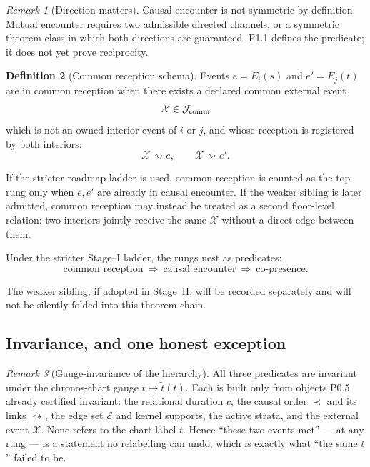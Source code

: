 \documentclass[11pt,a4paper]{article}
\def\mathfrak#1{#1}%
\def\emph#1{#1}%
\theoremstyle{definition}
\newtheorem{definition}{Definition}[section]
\theoremstyle{plain}
\theoremstyle{remark}
\newtheorem{remark}[definition]{Remark}
\begin{document}
\begin{remark}[Direction matters]
Causal encounter is not symmetric by definition. Mutual encounter requires two
admissible directed channels, or a symmetric theorem class in which both
directions are guaranteed. P1.1 defines the predicate; it does not yet prove
reciprocity.
\end{remark}

\begin{definition}[Common reception schema]\label{def:comrec}
Events \(e=E_i(s)\) and \(e'=E_j(t)\) are in \emph{common reception} when there
exists a declared common external event
\[
\mathcal X\in\mathcal J_{\rm comm}
\]
which is not an owned interior event of \(i\) or \(j\), and whose reception is
registered by both interiors:
\[
\mathcal X\rightsquigarrow e,
\qquad
\mathcal X\rightsquigarrow e'.
\]

If the stricter roadmap ladder is used, common reception is counted as the top
rung only when \(e,e'\) are already in causal encounter. If the weaker sibling is
later admitted, common reception may instead be treated as a second floor-level
relation: two interiors jointly receive the same \(\mathcal X\) without a direct
edge between them.
\end{definition}

Under the stricter Stage--I ladder, the rungs nest as predicates:
\[
\boxed{\;
\text{common reception}\ \Longrightarrow\ \text{causal encounter}\ \Longrightarrow\ \text{co-presence}.
\;}
\]

The weaker sibling, if adopted in Stage~II, will be recorded separately and will not
be silently folded into this theorem chain.

\subsection{Invariance, and one honest exception}

\begin{remark}[Gauge-invariance of the hierarchy]
All three predicates are invariant under the chronos-chart gauge \(t\mapsto\widetilde t(t)\).
Each is built only from objects P0.5 already certified invariant: the relational duration
\(\mathfrak c\), the causal order \(\prec\) and its links \(\rightsquigarrow\), the edge set
\(\mathcal E\) and kernel supports, the active strata, and the external event \(\mathcal X\).
None refers to the chart label \(t\). Hence ``these two events met'' --- at any rung --- is
a statement no relabelling can undo, which is exactly what ``the same \(t\)'' failed to be.
\end{remark}
\end{document}
